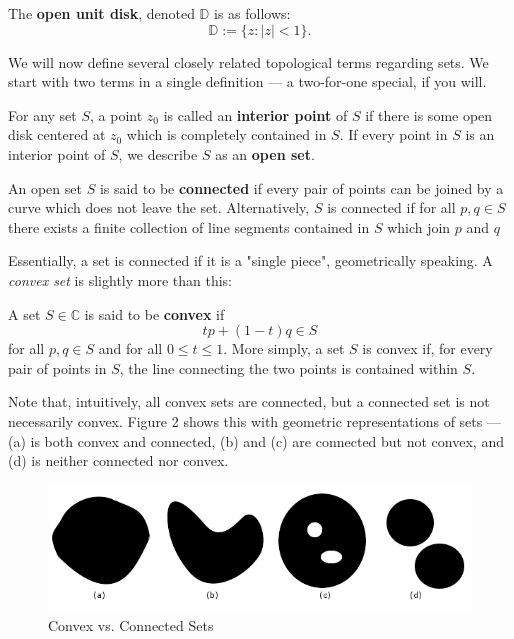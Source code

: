 \begin{defn}
The \textbf{open unit disk}, denoted $\mathbb{D}$ is as follows:
\[\mathbb{D} := \{z : |z| < 1\}.\]
\end{defn}

We will now define several closely related topological terms regarding sets.  We start with two terms in a single definition --- a two-for-one special, if you will.
\begin{defn}
For any set $S$, a point $z_0$ is called an \textbf{interior point} of $S$ if there is some open disk centered at $z_0$ which is completely contained in $S$.  If every point in $S$ is an interior point of $S$, we describe $S$ as an \textbf{open set}. 
\end{defn}

\begin{defn}
An open set $S$ is said to be \textbf{connected} if every pair of points can be joined by a curve which does not leave the set.  Alternatively, $S$ is connected if for all $p,q \in S$ there exists a finite collection of line segments contained in $S$ which join $p$ and $q$
\end{defn}

Essentially, a set is connected if it is a "single piece", geometrically speaking.  A \textit{convex set} is slightly more than this:

\begin{defn}
A set $S \in \mathbb{C}$ is said to be \textbf{convex} if
\[tp+(1-t)q \in S\]
for all $p,q \in S$ and for all $0 \leq t \leq 1$.  More simply, a set $S$ is convex if, for every pair of points in $S$, the line connecting the two points is contained within $S$.
\end{defn}

Note that, intuitively, all convex sets are connected, but a connected set is not necessarily convex.  Figure 2 shows this with geometric representations of sets --- (a) is both convex and connected, (b) and (c) are connected but not convex, and (d) is neither connected nor convex.

\begin{figure}[h]
\centering
\includegraphics[scale=0.5]{images/convexvconnected.png}
\caption{Convex vs. Connected Sets}
\end{figure}

